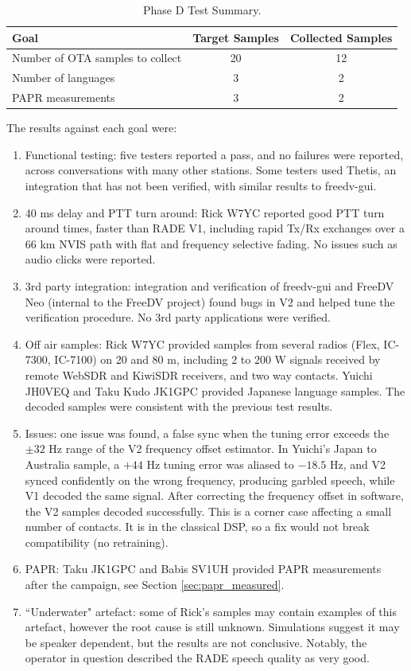 \documentclass{article}
\begin{document}
\begin{table} [h]
\caption{Phase D Test Summary.}
\label{tab:phase_d_summary}
\centering
\begin{tabular}{ l | c | c }
 \hline
 Goal & Target Samples & Collected Samples \\
 \hline
 Number of OTA samples to collect & 20 & 12 \\
 Number of languages & 3 & 2 \\
 PAPR measurements & 3 & 2 \\
 \hline
 \hline
\end{tabular}
\end{table}

The results against each goal were:
\begin{enumerate}
\item Functional testing: five testers reported a pass, and no failures were reported, across conversations with many other stations.  Some testers used Thetis, an integration that has not been verified, with similar results to freedv-gui.
\item 40 \si{ms} delay and PTT turn around: Rick W7YC reported good PTT turn around times, faster than RADE V1, including rapid Tx/Rx exchanges over a 66 \si{km} NVIS path with flat and frequency selective fading.  No issues such as audio clicks were reported.
\item 3rd party integration: integration and verification of freedv-gui and FreeDV Neo (internal to the FreeDV project) found bugs in V2 and helped tune the verification procedure.  No 3rd party applications were verified.
\item Off air samples: Rick W7YC provided samples from several radios (Flex, IC-7300, IC-7100) on 20 and 80 m, including 2 to 200 W signals received by remote WebSDR and KiwiSDR receivers, and two way contacts.  Yuichi JH0VEQ and Taku Kudo JK1GPC provided Japanese language samples.  The decoded samples were consistent with the previous test results.
\item Issues: one issue was found, a false sync when the tuning error exceeds the $\pm 32$ \si{Hz} range of the V2 frequency offset estimator.  In Yuichi's Japan to Australia sample, a $+44$ \si{Hz} tuning error was aliased to $-18.5$ \si{Hz}, and V2 synced confidently on the wrong frequency, producing garbled speech, while V1 decoded the same signal.  After correcting the frequency offset in software, the V2 samples decoded successfully.  This is a corner case affecting a small number of contacts.  It is in the classical DSP, so a fix would not break compatibility (no retraining).
\item PAPR: Taku JK1GPC and Babis SV1UH provided PAPR measurements after the campaign, see Section \ref{sec:papr_measured}.
\item ``Underwater" artefact: some of Rick's samples may contain examples of this artefact, however the root cause is still unknown.  Simulations suggest it may be speaker dependent, but the results are not conclusive.  Notably, the operator in question described the RADE speech quality as very good.
\end{enumerate}
\end{document}
